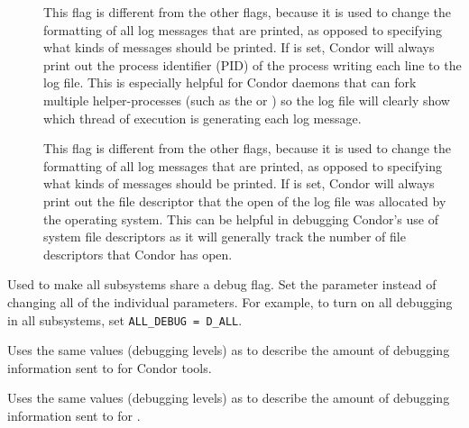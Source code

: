 \begin{description}
\begin{description}
  \item[] \label{dflag:pid}
    This flag is different from the other flags, because it is
    used to change the formatting of all log messages that are printed,
    as opposed to specifying what kinds of messages should be printed.
    If  is set, Condor will always print out the process
    identifier (PID) of the process writing each line to the log file.
    This is especially helpful for Condor daemons that can fork
    multiple helper-processes (such as the  or
    ) so the log file will clearly show which thread
    of execution is generating each log message.
    
  \item[] \label{dflag:fds}
    This flag is different from the other flags, because it is
    used to change the formatting of all log messages that are printed,
    as opposed to specifying what kinds of messages should be printed.
    If  is set, Condor will always print out the file descriptor
    that the open of the log file was allocated by the operating system.
    This can be helpful in debugging Condor's use of system file
    descriptors as it will generally track the number of file descriptors
    that Condor has open.

    
  \end{description}

\item[\Macro{ALL\_DEBUG}] \label{param:AllDebug} Used to make all subsystems
  share a debug flag. Set the parameter 
  instead of changing all of the individual parameters.  For example,
  to turn on all debugging in all subsystems, set
  \verb$ALL_DEBUG = D_ALL$.

\item[\Macro{TOOL\_DEBUG}] \label{param:ToolDebug} Uses the same
  values (debugging levels) as  to
  describe the amount of debugging information sent to  
  for Condor tools.

\item[\Macro{SUBMIT\_DEBUG}] \label{param:SubmitDebug} Uses the same
  values (debugging levels) as  to
  describe the amount of debugging information sent to  
  for .

\end{description}

